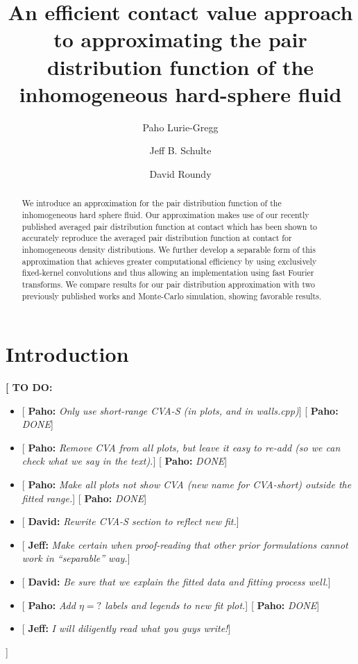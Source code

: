 \documentclass[letterpaper,twocolumn,amsmath,amssymb,pre,aps,10pt]{revtex4-1}
\newcommand{\red}[1]{{\bf \color{red} #1}}
\newcommand{\green}[1]{{\bf \color{green} #1}}
\newcommand{\blue}[1]{{\bf \color{blue} #1}}
\newcommand{\cyan}[1]{{\bf \color{cyan} #1}}
\newcommand{\fixme}[1]{\red{[#1]}}
\newcommand{\davidsays}[1]{{\color{red} [\green{David:} \emph{#1}]}}
\newcommand{\jeffsays}[1]{{\color{red} [\cyan{Jeff:} \emph{#1}]}}
\newcommand{\pahosays}[1]{{\color{red} [\blue{Paho:} \emph{#1}]}}
\begin{document}
\title{An efficient contact value approach to approximating the pair distribution
  function of the inhomogeneous hard-sphere fluid}

\author{Paho Lurie-Gregg}
\author{Jeff B. Schulte}
\author{David Roundy}

\begin{abstract}
We introduce an approximation for the pair distribution function of
the inhomogeneous hard sphere fluid. Our approximation makes use of
our recently published averaged pair distribution function at contact
which has been shown to accurately reproduce the averaged pair
distribution function at contact for inhomogeneous density
distributions. We further develop a separable form of this
approximation that achieves greater computational efficiency by using
exclusively fixed-kernel convolutions and thus allowing an
implementation using fast Fourier transforms. We compare results for
our pair distribution approximation with two previously published
works and Monte-Carlo simulation, showing favorable results.
\end{abstract}

\maketitle

\section{Introduction}

\fixme{
  TO DO:
  \begin{itemize}
  \item \pahosays{Only use short-range CVA-S (in plots, and in walls.cpp)}\pahosays{DONE}
  \item \pahosays{Remove CVA from all plots, but leave it easy to
    re-add (so we can check what we say in the text).}\pahosays{DONE}
  \item \pahosays{Make all plots not show CVA (new name for CVA-short)
    outside the fitted range.}\pahosays{DONE}
  \item \davidsays{Rewrite CVA-S section to reflect new fit.}
  \item \jeffsays{Make certain when proof-reading that other prior
    formulations cannot work in ``separable'' way.}
  \item \davidsays{Be sure that we explain the fitted data and fitting
    process well.}
  \item \pahosays{Add $\eta=?$ labels and legends to new fit plot.}\pahosays{DONE}
  \item \jeffsays{I will diligently read what you guys write!}
  \end{itemize}
}
\end{document}
